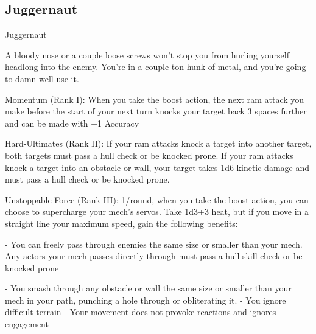 \subsection{Juggernaut}

                                                Juggernaut

A bloody nose or a couple loose screws won’t stop you from hurling yourself headlong into the enemy.
You’re in a couple-ton hunk of metal, and you’re going to damn well use it.

Momentum (Rank I): When you take the boost action, the next ram attack you make before the
start of your next turn knocks your target back 3 spaces further and can be made with +1
Accuracy

Hard-Ultimates (Rank II): If your ram attacks knock a target into another target, both targets
must pass a hull check or be knocked prone. If your ram attacks knock a target into an obstacle
or wall, your target takes 1d6 kinetic damage and must pass a hull check or be knocked prone.

Unstoppable Force (Rank III): 1/round, when you take the boost action, you can choose to
supercharge your mech’s servos. Take 1d3+3 heat, but if you move in a straight line your
maximum speed, gain the following benefits:

             -    You can freely pass through enemies the same size or smaller than your mech.
                 Any actors your mech passes directly through must pass a hull skill check or be
                  knocked prone

             -    You smash through any obstacle or wall the same size or smaller than your mech
                  in your path, punching a hole through or obliterating it.
             -    You ignore difficult terrain
             -    Your movement does not provoke reactions and ignores engagement